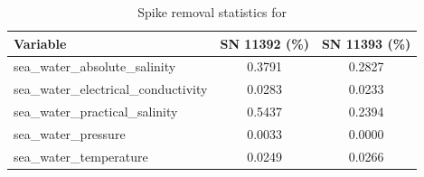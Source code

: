\begin{table}[h]
\centering
\caption{Spike removal statistics for \projectname{} \casenumber{}}
\label{tab:spike_stats}
\begin{tabular}{|l|c|c|}
\hline
Variable & SN 11392 (\%) & SN 11393 (\%) \\
\hline
sea\_water\_absolute\_salinity & 0.3791 & 0.2827 \\
sea\_water\_electrical\_conductivity & 0.0283 & 0.0233 \\
sea\_water\_practical\_salinity & 0.5437 & 0.2394 \\
sea\_water\_pressure & 0.0033 & 0.0000 \\
sea\_water\_temperature & 0.0249 & 0.0266 \\
\hline
\end{tabular}
\end{table}
